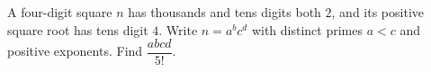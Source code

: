A four-digit square $n$ has thousands and tens digits both $2$, and its positive square root has tens digit $4$. Write $n=a^bc^d$ with distinct primes $a<c$ and positive exponents. Find $\dfrac{abcd}{5!}$.
